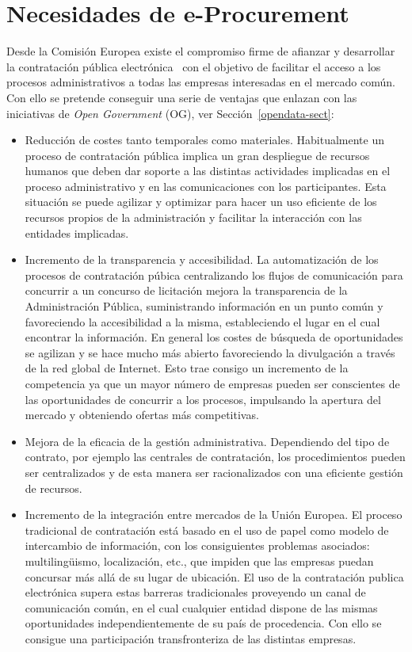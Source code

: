 \section{Necesidades de e-Procurement}
Desde la Comisión Europea existe el compromiso firme de afianzar y desarrollar la contratación
pública electrónica~\cite{plan2004,e-Proc-green-paper,ePractice} con el objetivo de facilitar el acceso a los procesos administrativos a todas
las empresas interesadas en el mercado común. Con ello se pretende conseguir una serie
de ventajas que enlazan con las iniciativas de \textit{Open Government} (\gls{OG}), ver Sección~\ref{opendata-sect}:
\begin{itemize}
 \item Reducción de costes tanto temporales como materiales. Habitualmente un proceso
de contratación pública implica un gran despliegue de recursos humanos que deben dar 
soporte a las distintas actividades implicadas en el proceso administrativo y en las
comunicaciones con los participantes. Esta situación se puede agilizar y optimizar
para hacer un uso eficiente de los recursos propios de la administración y facilitar
la interacción con las entidades implicadas.
\item Incremento de la transparencia y accesibilidad. La automatización de los procesos
de contratación púbica centralizando los flujos de comunicación para concurrir a un concurso
de licitación mejora la transparencia de la Administración Pública, suministrando información
en un punto común y favoreciendo la accesibilidad a la misma, estableciendo el lugar 
en el cual encontrar la información. En general los costes de búsqueda de oportunidades
se agilizan y se hace mucho más abierto favoreciendo la divulgación a través
de la red global de Internet. Esto trae consigo un incremento de la competencia
ya que un mayor número de empresas pueden ser conscientes de las oportunidades de concurrir
a los procesos, impulsando la apertura del mercado y obteniendo ofertas más competitivas.
\item Mejora de la eficacia de la gestión administrativa. Dependiendo del tipo de contrato,
por ejemplo las centrales de contratación, los procedimientos pueden ser centralizados y de esta manera
ser racionalizados con una eficiente gestión de recursos.
\item Incremento de la integración entre mercados de la Unión Europea. El proceso
tradicional de contratación está basado en el uso de papel como modelo de intercambio
de información, con los consiguientes problemas asociados: multiling\"{u}ismo, localización, etc.,  
que impiden que las empresas puedan concursar más allá de su lugar de ubicación. El uso de la contratación
publica electrónica supera estas barreras tradicionales proveyendo un canal de comunicación
común, en el cual cualquier entidad dispone de las mismas oportunidades independientemente
de su país de procedencia. Con ello se consigue una participación transfronteriza
de las distintas empresas.
\end{itemize}

